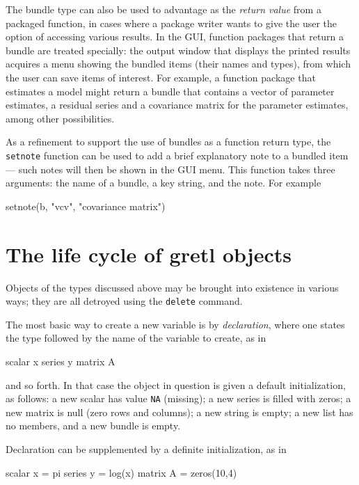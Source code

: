 The bundle type can also be used to advantage as the \textit{return
  value} from a packaged function, in cases where a package writer
wants to give the user the option of accessing various results. In the
 GUI, function packages that return a bundle are treated
specially: the output window that displays the printed results
acquires a menu showing the bundled items (their names and types),
from which the user can save items of interest. For example, a
function package that estimates a model might return a bundle that
contains a vector of parameter estimates, a residual series and a
covariance matrix for the parameter estimates, among other
possibilities.

As a refinement to support the use of bundles as a function return
type, the \texttt{setnote} function can be used to add a brief
explanatory note to a bundled item --- such notes will then be shown
in the GUI menu.  This function takes three arguments: the name of a
bundle, a key string, and the note. For example

\begin{code}
setnote(b, "vcv", "covariance matrix")
\end{code}

\section{The life cycle of gretl objects}

Objects of the types discussed above may be brought into existence in
various ways; they are all detroyed using the \texttt{delete} command.

The most basic way to create a new variable is by
\textit{declaration}, where one states the type followed by the name
of the variable to create, as in

\begin{code}
scalar x
series y
matrix A
\end{code}

and so forth. In that case the object in question is given a default
initialization, as follows: a new scalar has value \texttt{NA}
(missing); a new series is filled with zeros; a new matrix is null
(zero rows and columns); a new string is empty; a new list has no
members, and a new bundle is empty.

Declaration can be supplemented by a definite initialization, as in

\begin{code}
scalar x = pi
series y = log(x)
matrix A = zeros(10,4)
\end{code}

